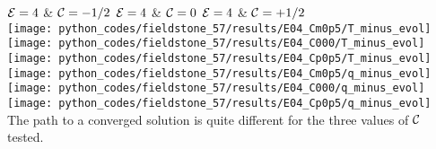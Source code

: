 \begin{center}
${\cal E}=4$ \& ${\cal C}=-1/2$  \hspace{2cm}
${\cal E}=4$ \& ${\cal C}=0$ \hspace{2cm}
${\cal E}=4$ \& ${\cal C}=+1/2$\\
\texttt{[image: python\_codes/fieldstone\_57/results/E04\_Cm0p5/T\_minus\_evol]}
\texttt{[image: python\_codes/fieldstone\_57/results/E04\_C000/T\_minus\_evol]}
\texttt{[image: python\_codes/fieldstone\_57/results/E04\_Cp0p5/T\_minus\_evol]}\\
\texttt{[image: python\_codes/fieldstone\_57/results/E04\_Cm0p5/q\_minus\_evol]}
\texttt{[image: python\_codes/fieldstone\_57/results/E04\_C000/q\_minus\_evol]}
\texttt{[image: python\_codes/fieldstone\_57/results/E04\_Cp0p5/q\_minus\_evol]}\\
{\captionfont The path to a converged solution is quite different for the three values 
of ${\cal C}$ tested.} 
\end{center}




